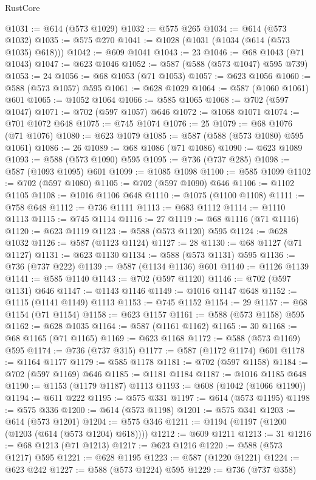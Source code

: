\begin{lexlean}{RustCore}
\begin{coremodule}
@1031 := @614 (@573 @1029)
@1032 := @575 @265
@1034 := @614 (@573 @1032)
@1035 := @575 @270
@1041 := @1028 (@1031 (@1034 (@614 (@573 @1035) @618)))
@1042 := @609 @1041
@1043 := 23
@1046 := @68 @1043 (@71 @1043)
@1047 := @623 @1046
@1052 := @587 (@588 (@573 @1047) @595 @739)
@1053 := 24
@1056 := @68 @1053 (@71 @1053)
@1057 := @623 @1056
@1060 := @588 (@573 @1057) @595
@1061 := @628 @1029
@1064 := @587 (@1060 @1061) @601
@1065 := @1052 @1064
@1066 := @585 @1065
@1068 := @702 (@597 @1047)
@1071 := @702 (@597 @1057) @646
@1072 := @1068 @1071
@1074 := @701 @1072 @648
@1075 := @745 @1074
@1076 := 25
@1079 := @68 @1076 (@71 @1076)
@1080 := @623 @1079
@1085 := @587 (@588 (@573 @1080) @595 @1061)
@1086 := 26
@1089 := @68 @1086 (@71 @1086)
@1090 := @623 @1089
@1093 := @588 (@573 @1090) @595
@1095 := @736 (@737 @285)
@1098 := @587 (@1093 @1095) @601
@1099 := @1085 @1098
@1100 := @585 @1099
@1102 := @702 (@597 @1080)
@1105 := @702 (@597 @1090) @646
@1106 := @1102 @1105
@1108 := @1016 @1106 @648
@1110 := @1075 (@1100 @1108)
@1111 := @758 @648
@1112 := @736 @1111
@1113 := @683 @1112
@1114 := @1110 @1113
@1115 := @745 @1114
@1116 := 27
@1119 := @68 @1116 (@71 @1116)
@1120 := @623 @1119
@1123 := @588 (@573 @1120) @595
@1124 := @628 @1032
@1126 := @587 (@1123 @1124)
@1127 := 28
@1130 := @68 @1127 (@71 @1127)
@1131 := @623 @1130
@1134 := @588 (@573 @1131) @595
@1136 := @736 (@737 @222)
@1139 := @587 (@1134 @1136) @601
@1140 := @1126 @1139
@1141 := @585 @1140
@1143 := @702 (@597 @1120)
@1146 := @702 (@597 @1131) @646
@1147 := @1143 @1146
@1149 := @1016 @1147 @648
@1152 := @1115 (@1141 @1149) @1113
@1153 := @745 @1152
@1154 := 29
@1157 := @68 @1154 (@71 @1154)
@1158 := @623 @1157
@1161 := @588 (@573 @1158) @595
@1162 := @628 @1035
@1164 := @587 (@1161 @1162)
@1165 := 30
@1168 := @68 @1165 (@71 @1165)
@1169 := @623 @1168
@1172 := @588 (@573 @1169) @595
@1174 := @736 (@737 @315)
@1177 := @587 (@1172 @1174) @601
@1178 := @1164 @1177
@1179 := @585 @1178
@1181 := @702 (@597 @1158)
@1184 := @702 (@597 @1169) @646
@1185 := @1181 @1184
@1187 := @1016 @1185 @648
@1190 := @1153 (@1179 @1187) @1113
@1193 := @608 (@1042 (@1066 @1190))
@1194 := @611 @222
@1195 := @575 @331
@1197 := @614 (@573 @1195)
@1198 := @575 @336
@1200 := @614 (@573 @1198)
@1201 := @575 @341
@1203 := @614 (@573 @1201)
@1204 := @575 @346
@1211 := @1194 (@1197 (@1200 (@1203 (@614 (@573 @1204) @618))))
@1212 := @609 @1211
@1213 := 31
@1216 := @68 @1213 (@71 @1213)
@1217 := @623 @1216
@1220 := @588 (@573 @1217) @595
@1221 := @628 @1195
@1223 := @587 (@1220 @1221)
@1224 := @623 @242
@1227 := @588 (@573 @1224) @595
@1229 := @736 (@737 @358)

\end{coremodule}
\end{lexlean}
